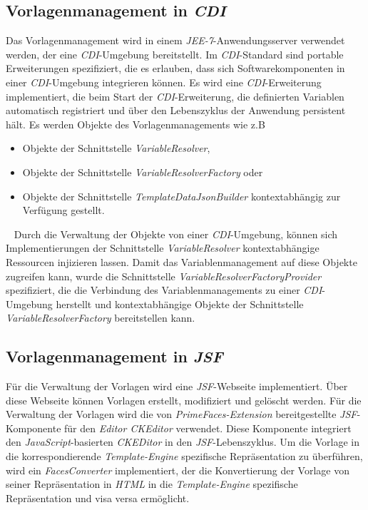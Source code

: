 \subsection{Vorlagenmanagement in \emph{CDI}}
\label{sec:sub-template-management-cdi}
Das Vorlagenmanagement wird in einem \emph{JEE-7}-Anwendungsserver verwendet werden, der eine \emph{CDI}-Umgebung bereitstellt. Im \emph{CDI}-Standard sind portable Erweiterungen  spezifiziert, die es erlauben, dass sich Softwarekomponenten in einer \emph{CDI}-Umgebung integrieren können. Es wird eine \emph{CDI}-Erweiterung implementiert, die beim Start der \emph{CDI}-Erweiterung, die definierten Variablen automatisch registriert und über den Lebenszyklus der Anwendung persistent hält. Es werden Objekte des Vorlagenmanagements wie z.B
\begin{itemize}
	\item Objekte der Schnittstelle \emph{VariableResolver},
	\item Objekte der Schnittstelle \emph{VariableResolverFactory} oder
	\item Objekte der Schnittstelle \emph{TemplateDataJsonBuilder} kontextabhängig zur Verfügung gestellt.
\end{itemize}
\ \newline
Durch die Verwaltung der Objekte von einer \emph{CDI}-Umgebung, können sich Implementierungen der Schnittstelle \emph{VariableResolver} kontextabhängige Ressourcen injizieren lassen. Damit das Variablenmanagement auf diese Objekte zugreifen kann, wurde die Schnittstelle \emph{VariableResolverFactoryProvider} spezifiziert, die die Verbindung des Variablenmanagements zu einer \emph{CDI}-Umgebung herstellt und kontextabhängige Objekte der Schnittstelle \emph{VariableResolverFactory} bereitstellen kann.

\subsection{Vorlagenmanagement in \emph{JSF}}
\label{sec-sub-specification-jsf}
Für die Verwaltung der Vorlagen wird eine \emph{JSF}-Webseite implementiert. Über diese Webseite können Vorlagen erstellt, modifiziert und gelöscht werden. Für die Verwaltung der Vorlagen wird die von \emph{PrimeFaces-Extension} bereitgestellte \emph{JSF}-Komponente für den \emph{Editor CKEditor} verwendet. Diese Komponente integriert den \emph{JavaScript}-basierten \emph{CKEDitor} in den \emph{JSF}-Lebenszyklus. Um die Vorlage in die korrespondierende \emph{Template-Engine} spezifische Repräsentation zu überführen, wird ein \emph{FacesConverter} implementiert, der die Konvertierung der Vorlage von seiner Repräsentation in \emph{HTML} in die \emph{Template-Engine} spezifische Repräsentation und visa versa ermöglicht.

